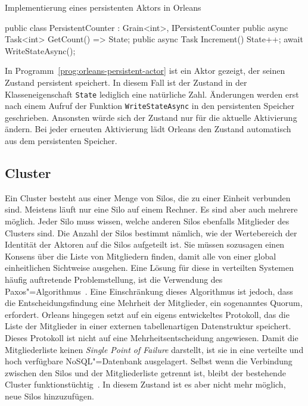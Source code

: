 \begin{program}[!hbt]
\caption{Implementierung eines persistenten Aktors in Orleans}
\label{prog:orleans-persistent-actor}
\begin{CsCode}
[StorageProvider(ProviderName="<provider-name>")]
public class PersistentCounter : Grain<int>, IPersistentCounter   {
	public async Task<int> GetCount() => State;
	public async Task Increment() {
		State++;
		await WriteStateAsync();
	}
}
\end{CsCode}
\end{program}

In Programm~\ref{prog:orleans-persistent-actor} ist ein Aktor gezeigt, der seinen Zustand persistent speichert. In diesem Fall ist der Zustand in der Klasseneigenschaft \lstinline{State} lediglich eine natürliche Zahl. Änderungen werden erst nach einem Aufruf der Funktion \lstinline{WriteStateAsync} in den persistenten Speicher geschrieben. Ansonsten würde sich der Zustand nur für die aktuelle Aktivierung ändern. Bei jeder erneuten Aktivierung lädt Orleans den Zustand automatisch aus dem persistenten Speicher.

\subsection{Cluster}

Ein Cluster besteht aus einer Menge von Silos, die zu einer Einheit verbunden sind. Meistens läuft nur eine Silo auf einem Rechner. Es sind aber auch mehrere möglich. Jeder Silo muss wissen, welche anderen Silos ebenfalls Mitglieder des Clusters sind. Die Anzahl der Silos bestimmt nämlich, wie der  Wertebereich der Identität der Aktoren auf die Silos aufgeteilt ist. Sie müssen sozusagen einen Konsens über die Liste von Mitgliedern finden, damit alle von einer global einheitlichen Sichtweise ausgehen. Eine Lösung für diese in verteilten Systemen häufig auftretende Problemstellung, ist die Verwendung des Paxos"=Algorithmus~\cite{Lamport:1998:PP:279227.279229}. Eine Einschränkung dieses Algorithmus ist jedoch, dass die Entscheidungsfindung eine Mehrheit der Mitglieder, ein sogenanntes Quorum, erfordert. Orleans hingegen setzt auf ein eigens entwickeltes Protokoll, das die Liste der Mitglieder in einer externen tabellenartigen Datenstruktur speichert. Dieses Protokoll ist nicht auf eine Mehrheitsentscheidung angewiesen. Damit die Mitgliederliste keinen \textit{\mbox{Single} Point of Failure} darstellt, ist sie in eine verteilte und hoch verfügbare \mbox{NoSQL}"=Datenbank ausgelagert. Selbst wenn die Verbindung zwischen den Silos und der Mitgliederliste getrennt ist, bleibt der bestehende Cluster funktionstüchtig~\cite{OrleansErlangGlasses}. In diesem Zustand ist es aber nicht mehr möglich, neue Silos hinzuzufügen.

